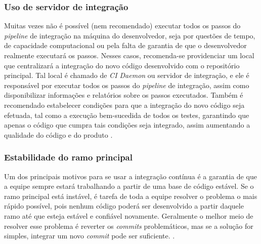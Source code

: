 \subsubsection{Uso de servidor de integração}\label{subsecao-servidor-de-integracao}
Muitas vezes não é possível (nem recomendado) executar todos os passos do \emph{pipeline} de integração na máquina do desenvolvedor, seja por questões de tempo, de capacidade computacional ou pela falta de garantia de que o desenvolvedor realmente executará os passos. Nesses casos, recomenda-se providenciar um local que centralizará a integração do novo código desenvolvido com o repositório principal. Tal local é chamado de \emph{CI Daemon} ou servidor de integração, e ele é responsável por executar todos os passos do \emph{pipeline} de integração, assim como disponibilizar informações e relatórios sobre os passos executados. Também é recomendado estabelecer condições para que a integração do novo código seja efetuada, tal como a execução bem-sucedida de todos os testes, garantindo que apenas o código que cumpra tais condições seja integrado, assim aumentando a qualidade do código e do produto \cite{martin-fowler-continuous-integration,continuous-delivery-jez-humble}.

\subsubsection{Estabilidade do ramo principal}
Um dos principais motivos para se usar a integração contínua é a garantia de que a equipe sempre estará trabalhando a partir de uma base de código estável. Se o ramo principal está instável, é tarefa de toda a equipe resolver o problema o mais rápido possível, pois nenhum código poderá ser desenvolvido a partir daquele ramo até que esteja estável e confiável novamente. Geralmente o melhor meio de resolver esse problema é reverter os \emph{commits} problemáticos, mas se a solução for simples, integrar um novo \emph{commit} pode ser suficiente. \cite{martin-fowler-continuous-integration}.




